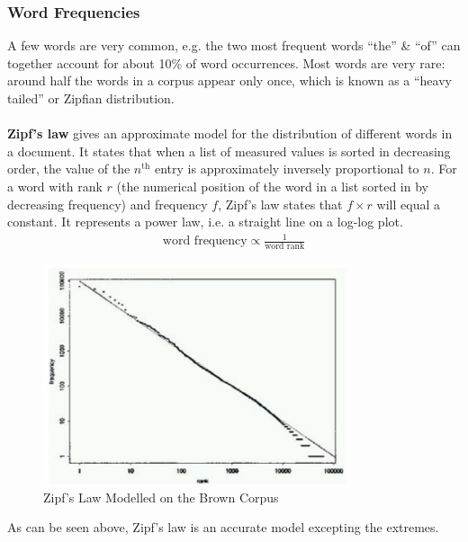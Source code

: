 \documentclass[a4paper,11pt]{article}
\begin{document}
\subsubsection{Word Frequencies}
A few words are very common, e.g. the two most frequent words ``the'' \& ``of'' can together account for about 10\% of word occurrences.
Most words are very rare: around half the words in a corpus appear only once, which is known as a ``heavy tailed'' or Zipfian distribution.
\\\\
\textbf{Zipf's law} gives an approximate model for the distribution of different words in a document.
It states that when a list of measured values is sorted in decreasing order, the value of the $n^{\text{th}}$ entry is approximately inversely proportional to $n$.
For a word with rank $r$ (the numerical position of the word in a list sorted in by decreasing frequency) and frequency $f$, Zipf's law states that $f \times r$ will equal a constant.
It represents a power law, i.e. a straight line on a log-log plot.
\begin{align*}
    \text{word frequency} \propto \frac{1}{\text{word rank}}
\end{align*}

\begin{figure}[H]
    \centering
    \includegraphics[width=0.8\textwidth]{./images/zipfs_law_brown_corpus.png}
    \caption{Zipf's Law Modelled on the Brown Corpus}
\end{figure}

As can be seen above, Zipf's law is an accurate model excepting the extremes.
\end{document}
